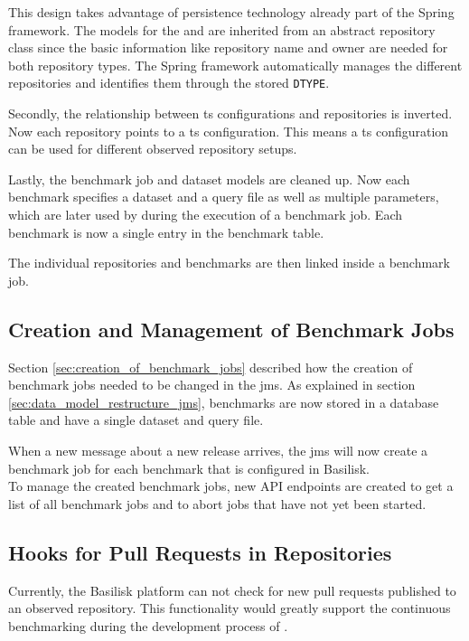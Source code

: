 This design takes advantage of persistence technology already part of the Spring framework.
The models for the \gh{} and \dockh{} are inherited from an abstract repository class since the basic information like repository name and owner are needed for both repository types.
The Spring framework automatically manages the different repositories and identifies them through the stored \texttt{DTYPE}.

Secondly, the relationship between \ac{ts} configurations and repositories is inverted. 
Now each repository points to a \ac{ts} configuration.
This means a \ac{ts} configuration can be used for different observed repository setups.

Lastly, the benchmark job and dataset models are cleaned up.
Now each benchmark specifies a dataset and a query file as well as multiple parameters, which are later used by \iguana{} during the execution of a benchmark job.
Each benchmark is now a single entry in the benchmark table.

The individual repositories and benchmarks are then linked inside a benchmark job.


\subsection{Creation and Management of Benchmark Jobs}
\label{sec:creation_of_benchmark_jobs_design}
Section \ref{sec:creation_of_benchmark_jobs} described how the creation of benchmark jobs needed to be changed in the \ac{jms}.
As explained in section \ref{sec:data_model_restructure_jms}, benchmarks are now stored in a database table and have a single dataset and query file.

When a new message about a new release arrives, the \ac{jms} will now create a benchmark job for each benchmark that is configured in Basilisk.
\\

To manage the created benchmark jobs, new API endpoints are created to get a list of all benchmark jobs and to abort jobs that have not yet been started.


\subsection{Hooks for Pull Requests in \gh{} Repositories}
\label{sec:pullrequests_hcs_design}
Currently, the Basilisk platform can not check for new pull requests published to an observed repository.
This functionality would greatly support the continuous benchmarking during the development process of \tsp{}.

